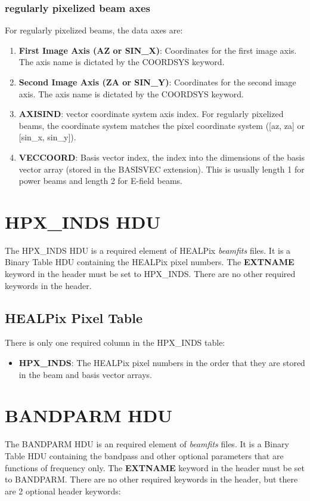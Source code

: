 \documentclass[11pt, oneside]{article}   	%
\begin{document}
\subsubsection{regularly pixelized beam axes}
For regularly pixelized beams, the data axes are: 
\begin{enumerate}
\item{\textbf{First Image Axis (AZ or SIN\_X)}: Coordinates for the first image axis. The axis name is dictated by the COORDSYS keyword.}
\item{\textbf{Second Image Axis (ZA or SIN\_Y)}: Coordinates for the second image axis. The axis name is dictated by the COORDSYS keyword.}
\item{\textbf{AXISIND}: vector coordinate system axis index. For regularly pixelized beams, the coordinate system matches the pixel coordinate system ([az, za] or [sin\_x, sin\_y]).}
\item{\textbf{VECCOORD}: Basis vector index, the index into the dimensions of the basis vector array (stored in the BASISVEC extension). This is usually length 1 for power beams and length 2 for E-field beams.}
\end{enumerate}

\section{HPX\_INDS HDU}
The HPX\_INDS HDU is a required element of HEALPix \textit{beamfits} files. It is a Binary Table HDU containing the HEALPix pixel numbers.
The \textbf{EXTNAME} keyword in the header must be set to HPX\_INDS. There are no other required keywords in the header.

\subsection{HEALPix Pixel Table}
There is only one required column in the HPX\_INDS table:

\begin{itemize}
\item{\textbf{HPX\_INDS}: The HEALPix pixel numbers in the order that they are stored in the beam and basis vector arrays.}
\end{itemize}

\section{BANDPARM HDU}
The BANDPARM HDU is an required element of \textit{beamfits} files. It is a Binary Table HDU containing the bandpass and other optional parameters that are functions of frequency only.
The \textbf{EXTNAME} keyword in the header must be set to BANDPARM. There are no other required keywords in the header, but there are 2 optional header keywords:
\end{document}
